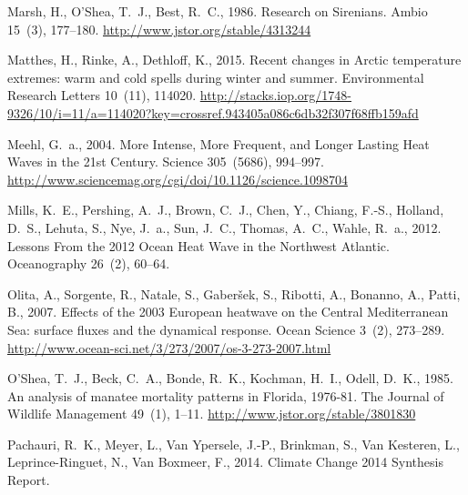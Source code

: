 \documentclass[a4paper,10pt,review]{elsarticle}
\begin{document}
\begin{thebibliography}{50}
Marsh, H., O'Shea, T.~J., Best, R.~C., 1986. {Research on Sirenians}. Ambio
  15~(3), 177--180.
\newline\urlprefix\url{http://www.jstor.org/stable/4313244}

Matthes, H., Rinke, A., Dethloff, K., 2015. {Recent changes in Arctic
  temperature extremes: warm and cold spells during winter and summer}.
  Environmental Research Letters 10~(11), 114020.
\newline\urlprefix\url{http://stacks.iop.org/1748-9326/10/i=11/a=114020?key=crossref.943405a086c6db32f307f68ffb159afd}

Meehl, G.~a., 2004. {More Intense, More Frequent, and Longer Lasting Heat Waves
  in the 21st Century}. Science 305~(5686), 994--997.
\newline\urlprefix\url{http://www.sciencemag.org/cgi/doi/10.1126/science.1098704}

Mills, K.~E., Pershing, A.~J., Brown, C.~J., Chen, Y., Chiang, F.-S., Holland,
  D.~S., Lehuta, S., Nye, J.~a., Sun, J.~C., Thomas, A.~C., Wahle, R.~a., 2012.
  {Lessons From the 2012 Ocean Heat Wave in the Northwest Atlantic}.
  Oceanography 26~(2), 60--64.

Olita, A., Sorgente, R., Natale, S., Gaber{\v{s}}ek, S., Ribotti, A., Bonanno,
  A., Patti, B., 2007. {Effects of the 2003 European heatwave on the Central
  Mediterranean Sea: surface fluxes and the dynamical response}. Ocean Science
  3~(2), 273--289.
\newline\urlprefix\url{http://www.ocean-sci.net/3/273/2007/os-3-273-2007.html}

O'Shea, T.~J., Beck, C.~A., Bonde, R.~K., Kochman, H.~I., Odell, D.~K., 1985.
  {An analysis of manatee mortality patterns in Florida, 1976-81}. The Journal
  of Wildlife Management 49~(1), 1--11.
\newline\urlprefix\url{http://www.jstor.org/stable/3801830}

Pachauri, R.~K., Meyer, L., {Van Ypersele}, J.-P., Brinkman, S., {Van
  Kesteren}, L., Leprince-Ringuet, N., {Van Boxmeer}, F., 2014. {Climate Change
  2014 Synthesis Report}.


\end{thebibliography}
\end{document}

